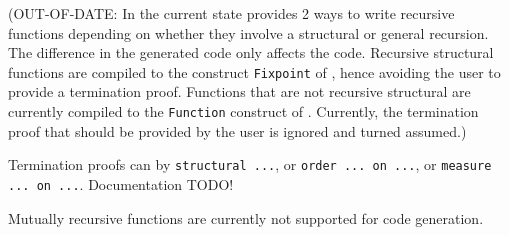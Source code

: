 
(OUT-OF-DATE:
In the current state {\focal} provides 2 ways to write recursive
functions depending on whether they involve a structural or general
recursion. The difference in the generated code only affects the
{\coq} code. Recursive structural functions are compiled to the
construct {\tt Fixpoint} of {\coq}, hence avoiding the user to provide a
termination proof. Functions that are not recursive structural are
currently compiled to the {\tt Function} construct of {\coq}. Currently,
the termination proof that should be provided by the user is ignored
and turned assumed.)

\medskip
Termination proofs can by {\tt structural ...}, or {\tt order ... on ...}, or
{\tt measure ... on ...}.
Documentation TODO!

\medskip
Mutually recursive functions are currently not supported for {\coq}
code generation.
